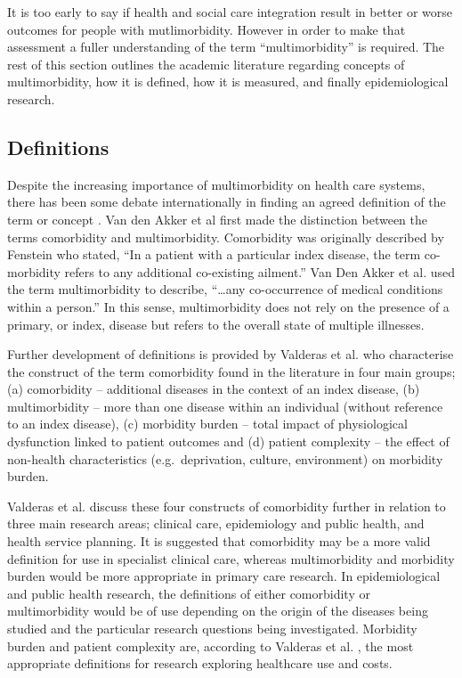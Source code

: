 \documentclass[12pt,]{report}
\begin{document}
It is too early to say if health and social care integration result in
better or worse outcomes for people with mutlimorbidity. However in
order to make that assessment a fuller understanding of the term
``multimorbidity'' is required. The rest of this section outlines the
academic literature regarding concepts of multimorbidity, how it is
defined, how it is measured, and finally epidemiological research.

\subsection{Definitions}\label{subsec:mm-defs}

Despite the increasing importance of multimorbidity on health care
systems, there has been some debate internationally in finding an agreed
definition of the term or concept \citep{RN89, RN95}. Van den Akker et
al \citeyearpar{RN19} first made the distinction between the terms
comorbidity and multimorbidity. Comorbidity was originally described by
Fenstein \citep[pp.467]{RN338} who stated, ``In a patient with a
particular index disease, the term co-morbidity refers to any additional
co-existing ailment.'' Van Den Akker et al. \citeyearpar[pp.65]{RN19}
used the term multimorbidity to describe, ``\ldots{}any co-occurrence of
medical conditions within a person.'' In this sense, multimorbidity does
not rely on the presence of a primary, or index, disease but refers to
the overall state of multiple illnesses.

Further development of definitions is provided by Valderas et al.
\citep{RN64} who characterise the construct of the term comorbidity
found in the literature in four main groups; (a) comorbidity --
additional diseases in the context of an index disease, (b)
multimorbidity -- more than one disease within an individual (without
reference to an index disease), (c) morbidity burden -- total impact of
physiological dysfunction linked to patient outcomes and (d) patient
complexity -- the effect of non-health characteristics
(e.g.~deprivation, culture, environment) on morbidity burden.

Valderas et al. \citep{RN64} discuss these four constructs of
comorbidity further in relation to three main research areas; clinical
care, epidemiology and public health, and health service planning. It is
suggested that comorbidity may be a more valid definition for use in
specialist clinical care, whereas multimorbidity and morbidity burden
would be more appropriate in primary care research. In epidemiological
and public health research, the definitions of either comorbidity or
multimorbidity would be of use depending on the origin of the diseases
being studied and the particular research questions being investigated.
Morbidity burden and patient complexity are, according to Valderas et
al. \citep{RN64}, the most appropriate definitions for research
exploring healthcare use and costs.
\end{document}
